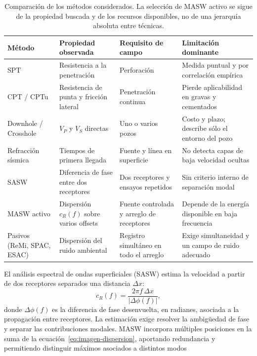 \begin{table}[!tb]
\centering
\footnotesize
\caption{Comparación de los métodos considerados. La selección de MASW activo se sigue
de la propiedad buscada y de los recursos disponibles, no de una jerarquía absoluta
entre técnicas. }
\begin{tabularx}{0.94\textwidth}{@{}lYYY@{}}
\toprule
Método & Propiedad observada & Requisito de campo & Limitación dominante \\
\midrule
SPT & Resistencia a la penetración & Perforación & Medida puntual y por correlación empírica \\
CPT / CPTu & Resistencia de punta y fricción lateral & Penetración continua & Pierde aplicabilidad en gravas y cementados \\
Downhole / Crosshole & $V_P$ y $V_S$ directas & Uno o varios pozos & Costo y plazo; describe sólo el entorno del pozo \\
Refracción sísmica & Tiempos de primera llegada & Fuente y línea en superficie & No detecta capas de baja velocidad ocultas \\
SASW & Diferencia de fase entre dos receptores & Dos receptores y ensayos repetidos & Sin criterio interno de separación modal \\
MASW activo & Dispersión $c_R(f)$ sobre varios offsets & Fuente controlada y arreglo de receptores & Depende de la energía disponible en baja frecuencia \\
Pasivos (ReMi, SPAC, ESAC) & Dispersión del ruido ambiental & Registro simultáneo en todo el arreglo & Exige simultaneidad y un campo de ruido adecuado \\
\bottomrule
\end{tabularx}
\end{table}

El análisis espectral de ondas superficiales (SASW) estima la velocidad a partir de dos receptores separados una distancia $\Delta x$:
\begin{equation}
c_R(f)=\frac{2\pi f\,\Delta x}{|\Delta\phi(f)|},
\label{eq:sasw-fase}
\end{equation}
donde $\Delta\phi(f)$ es la diferencia de fase desenvuelta, en radianes, asociada a la propagación entre receptores. La estimación exige resolver la ambigüedad de fase y separar las contribuciones modales. MASW incorpora múltiples posiciones en la suma de la ecuación~\eqref{eq:imagen-dispersion}, aportando redundancia y permitiendo distinguir máximos asociados a distintos modos 

